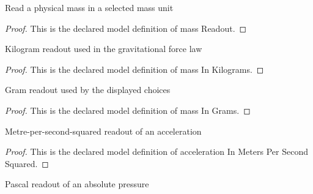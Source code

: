 \begin{definition}
  \label{def:physics:phyx-mini-0484:phyxminiproblems-problemphyxmini0484-massreadout}
  Read a physical mass in a selected mass unit
\end{definition}
\begin{proof}
  This is the declared model definition of mass Readout.
\end{proof}
\begin{definition}
  \label{def:physics:phyx-mini-0484:phyxminiproblems-problemphyxmini0484-massinkilograms}
  Kilogram readout used in the gravitational force law
\end{definition}
\begin{proof}
  This is the declared model definition of mass In Kilograms.
\end{proof}
\begin{definition}
  \label{def:physics:phyx-mini-0484:phyxminiproblems-problemphyxmini0484-massingrams}
  Gram readout used by the displayed choices
\end{definition}
\begin{proof}
  This is the declared model definition of mass In Grams.
\end{proof}
\begin{definition}
  \label{def:physics:phyx-mini-0484:phyxminiproblems-problemphyxmini0484-accelerationinmeterspersecondsquared}
  Metre-per-second-squared readout of an acceleration
\end{definition}
\begin{proof}
  This is the declared model definition of acceleration In Meters Per Second Squared.
\end{proof}
\begin{definition}
  \label{def:physics:phyx-mini-0484:phyxminiproblems-problemphyxmini0484-pressureinpascals}
  Pascal readout of an absolute pressure
\end{definition}

